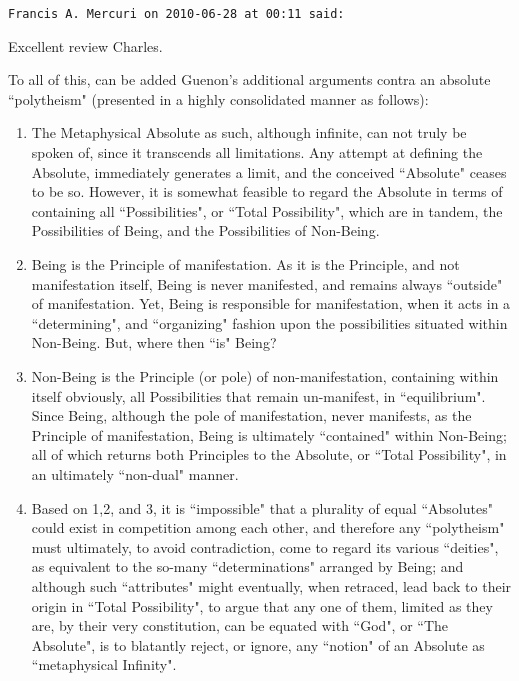 \begin{footnotesize}\begin{sffamily}



\texttt{Francis A. Mercuri on 2010-06-28 at 00:11 said: }

Excellent review Charles.

To all of this, can be added Guenon's additional arguments contra an absolute ``polytheism" (presented in a highly consolidated manner as follows):
\begin{enumerate}
\item The Metaphysical Absolute as such, although infinite, can not truly be spoken of, since it transcends all limitations. Any attempt at defining the Absolute, immediately generates a limit, and the conceived ``Absolute" ceases to be so. However, it is somewhat feasible to regard the Absolute in terms of containing all ``Possibilities", or ``Total Possibility", which are in tandem, the Possibilities of Being, and the Possibilities of Non-Being. 

\item Being is the Principle of manifestation. As it is the Principle, and not manifestation itself, Being is never manifested, and remains always ``outside" of manifestation. Yet, Being is responsible for manifestation, when it acts in a ``determining", and ``organizing" fashion upon the possibilities situated within Non-Being. But, where then ``is" Being?

\item Non-Being is the Principle (or pole) of non-manifestation, containing within itself obviously, all Possibilities that remain un-manifest, in ``equilibrium". Since Being, although the pole of manifestation, never manifests, as the Principle of manifestation, Being is ultimately ``contained" within Non-Being; all of which returns both Principles to the Absolute, or ``Total Possibility", in an ultimately ``non-dual" manner. 

\item Based on 1,2, and 3, it is ``impossible" that a plurality of equal ``Absolutes" could exist in competition among each other, and therefore any ``polytheism" must ultimately, to avoid contradiction, come to regard its various ``deities", as equivalent to the so-many ``determinations" arranged by Being; and although such ``attributes" might eventually, when retraced, lead back to their origin in ``Total Possibility", to argue that any one of them, limited as they are, by their very constitution, can be equated with ``God", or ``The Absolute", is to blatantly reject, or ignore, any ``notion" of an Absolute as ``metaphysical Infinity".
\end{enumerate}

\hfill


\end{sffamily}\end{footnotesize}
